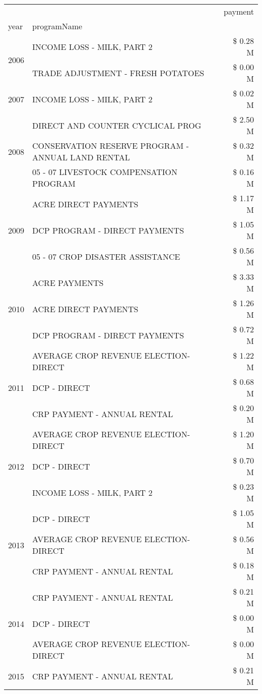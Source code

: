 \begin{tabular}{llr}
\toprule
 &  & payment \\
year & programName &  \\
\midrule
\multirow[t]{2}{*}{2006} & INCOME LOSS - MILK, PART 2 & \$ 0.28 M \\
 & TRADE ADJUSTMENT - FRESH POTATOES & \$ 0.00 M \\
\cline{1-3}
2007 & INCOME LOSS - MILK, PART 2 & \$ 0.02 M \\
\cline{1-3}
\multirow[t]{3}{*}{2008} & DIRECT AND COUNTER CYCLICAL PROG & \$ 2.50 M \\
 & CONSERVATION RESERVE PROGRAM - ANNUAL LAND RENTAL & \$ 0.32 M \\
 & 05 - 07 LIVESTOCK COMPENSATION PROGRAM & \$ 0.16 M \\
\cline{1-3}
\multirow[t]{3}{*}{2009} & ACRE DIRECT PAYMENTS & \$ 1.17 M \\
 & DCP PROGRAM - DIRECT PAYMENTS & \$ 1.05 M \\
 & 05 - 07 CROP DISASTER ASSISTANCE & \$ 0.56 M \\
\cline{1-3}
\multirow[t]{3}{*}{2010} & ACRE PAYMENTS & \$ 3.33 M \\
 & ACRE DIRECT PAYMENTS & \$ 1.26 M \\
 & DCP PROGRAM - DIRECT PAYMENTS & \$ 0.72 M \\
\cline{1-3}
\multirow[t]{3}{*}{2011} & AVERAGE CROP REVENUE ELECTION-DIRECT & \$ 1.22 M \\
 & DCP - DIRECT & \$ 0.68 M \\
 & CRP PAYMENT - ANNUAL RENTAL & \$ 0.20 M \\
\cline{1-3}
\multirow[t]{3}{*}{2012} & AVERAGE CROP REVENUE ELECTION-DIRECT & \$ 1.20 M \\
 & DCP - DIRECT & \$ 0.70 M \\
 & INCOME LOSS - MILK, PART 2 & \$ 0.23 M \\
\cline{1-3}
\multirow[t]{3}{*}{2013} & DCP - DIRECT & \$ 1.05 M \\
 & AVERAGE CROP REVENUE ELECTION-DIRECT & \$ 0.56 M \\
 & CRP PAYMENT - ANNUAL RENTAL & \$ 0.18 M \\
\cline{1-3}
\multirow[t]{3}{*}{2014} & CRP PAYMENT - ANNUAL RENTAL & \$ 0.21 M \\
 & DCP - DIRECT & \$ 0.00 M \\
 & AVERAGE CROP REVENUE ELECTION-DIRECT & \$ 0.00 M \\
\cline{1-3}
\multirow[t]{3}{*}{2015} & CRP PAYMENT - ANNUAL RENTAL & \$ 0.21 M \\

\end{tabular}
